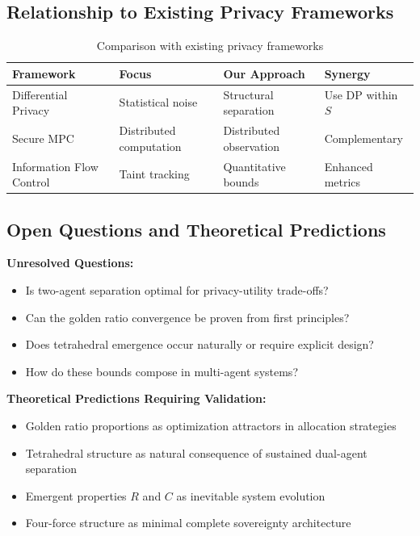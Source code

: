 \documentclass[11pt,a4paper]{article}
\theoremstyle{definition}
\begin{document}
\subsection{Relationship to Existing Privacy Frameworks}

\begin{table}[h]
\centering
\begin{tabular}{@{}llll@{}}
\toprule
Framework & Focus & Our Approach & Synergy \\
\midrule
Differential Privacy & Statistical noise & Structural separation & Use DP within $S$ \\
Secure MPC & Distributed computation & Distributed observation & Complementary \\
Information Flow Control & Taint tracking & Quantitative bounds & Enhanced metrics \\
\bottomrule
\end{tabular}
\caption{Comparison with existing privacy frameworks}
\end{table}

\subsection{Open Questions and Theoretical Predictions}

\textbf{Unresolved Questions:}

\begin{itemize}
    \item Is two-agent separation optimal for privacy-utility trade-offs?
    \item Can the golden ratio convergence be proven from first principles?
    \item Does tetrahedral emergence occur naturally or require explicit design?
    \item How do these bounds compose in multi-agent systems?
\end{itemize}

\textbf{Theoretical Predictions Requiring Validation:}

\begin{itemize}
    \item Golden ratio proportions as optimization attractors in allocation strategies
    \item Tetrahedral structure as natural consequence of sustained dual-agent separation
    \item Emergent properties $R$ and $C$ as inevitable system evolution
    \item Four-force structure as minimal complete sovereignty architecture
\end{itemize}
\end{document}

